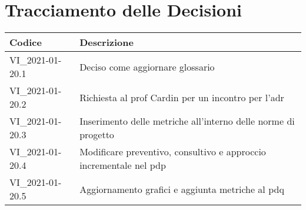 \section*{Tracciamento delle Decisioni}

\begin{center}
	\begin{longtable}{|p{3.5cm}|p{11cm}|}
		\hline
		\rowcolor{lighter-grayer}
		\textbf{Codice} & \textbf{Descrizione} \\
		\hline
		\endfirsthead

		\hline
		VI\_2021-01-20.1 & Deciso come aggiornare glossario \\
		VI\_2021-01-20.2 & Richiesta al prof Cardin per un incontro per l'adr\\
		VI\_2021-01-20.3 & Inserimento delle metriche all'interno delle norme di progetto\\
		VI\_2021-01-20.4 & Modificare preventivo, consultivo e approccio incrementale nel pdp \\
		VI\_2021-01-20.5 & Aggiornamento grafici e aggiunta metriche al pdq\\
		\hline
	\end{longtable}
\end{center}